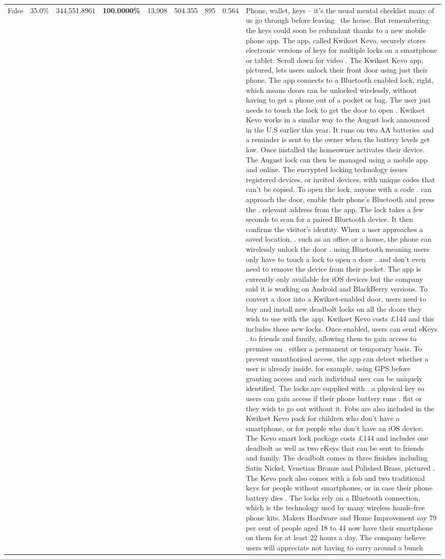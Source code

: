 \begin{table}[H]
\begin{tabular}{lllrlllll}
False & 35.0\% & 344,551.8961 & \bfseries \color{red} 100.0000\% & 13.908 & 504.355 & 895 & 0.564 & Phone, wallet, keys – it’s the usual mental checklist many of us go through before leaving  the house. But remembering the keys could soon be redundant thanks to a new mobile phone app. The app, called Kwikset Kevo, securely stores electronic versions of keys for multiple locks on a smartphone or tablet. Scroll down for video . The Kwikset Kevo app, pictured, lets users unlock their front door using just their phone. The app connects to a Bluetooth enabled lock, right, which means doors can be unlocked wirelessly, without having to get a phone out of a pocket or bag. The user just needs to touch the lock to get the door to open . Kwikset Kevo works in a similar way to the August lock announced in the U.S earlier this year. It runs on two AA batteries and a reminder is sent to the owner when the battery levels get low. Once installed the homeowner activates their device. The August lock can then be managed using a mobile app and online. The encrypted locking technology issues registered devices, or invited devices, with unique codes that can't be copied. To open the lock, anyone with a code . can approach the door, enable their phone's Bluetooth and press the . relevant address from the app. The lock takes a few seconds to scan for a paired Bluetooth device. It then confirms the visitor's identity. When a user approaches a saved location, . such as an office or a house, the phone can wirelessly unlock the door . using Bluetooth meaning users only have to touch a lock to open a door . and don't even need to remove the device from their pocket. The app is currently only available for iOS devices but the company said it is working on Android and BlackBerry versions. To convert a door into a Kwikset-enabled door, users need to buy and install new deadbolt locks on all the doors they wish to use with the app. Kwikset Kevo costs £144 and this includes these new locks. Once enabled, users can send eKeys . to friends and family, allowing them to gain access to premises on . either a permanent or temporary basis. To prevent unauthorised access, the app can detect whether a user is already inside, for example, using GPS before granting access and each individual user can be uniquely identified. The locks are supplied with . a physical key so users can gain access if their phone battery runs . flat or they wish to go out without it. Fobs are also included in the Kwikset Kevo pack for children who don't have a smartphone, or for people who don't have an iOS device. The Kevo smart lock package costs £144 and includes one deadbolt as well as two eKeys that can be sent to friends and family. The deadbolt comes in three finishes including Satin Nickel, Venetian Bronze and Polished Brass, pictured . The Kevo pack also comes with a fob and two traditional keys for people without smartphones, or in case their phone battery dies . The locks rely on a Bluetooth connection, which is the technology used by many wireless hands-free phone kits. Makers Hardware and Home Improvement say 79 per cent of people aged 18 to 44 now have their smartphone on them for at least 22 hours a day. The company believe users will appreciate not having to carry around a bunch 
\end{tabular}
\end{table}
